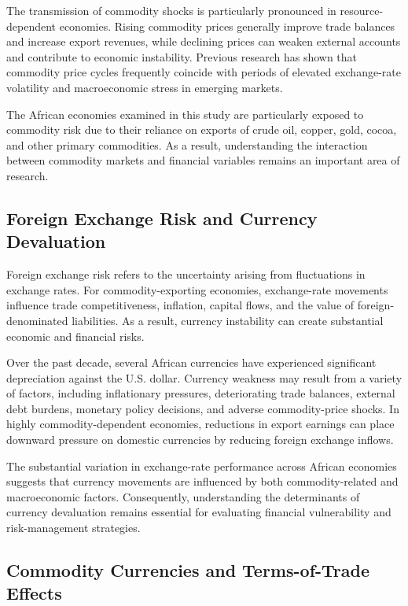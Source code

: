 \documentclass{article}
\begin{document}
The transmission of commodity shocks is particularly pronounced in resource-dependent economies. Rising commodity prices generally improve trade balances and increase export revenues, while declining prices can weaken external accounts and contribute to economic instability. Previous research has shown that commodity price cycles frequently coincide with periods of elevated exchange-rate volatility and macroeconomic stress in emerging markets.

The African economies examined in this study are particularly exposed to commodity risk due to their reliance on exports of crude oil, copper, gold, cocoa, and other primary commodities. As a result, understanding the interaction between commodity markets and financial variables remains an important area of research.

\subsection{Foreign Exchange Risk and Currency Devaluation}

Foreign exchange risk refers to the uncertainty arising from fluctuations in exchange rates. For commodity-exporting economies, exchange-rate movements influence trade competitiveness, inflation, capital flows, and the value of foreign-denominated liabilities. As a result, currency instability can create substantial economic and financial risks.

Over the past decade, several African currencies have experienced significant depreciation against the U.S. dollar. Currency weakness may result from a variety of factors, including inflationary pressures, deteriorating trade balances, external debt burdens, monetary policy decisions, and adverse commodity-price shocks. In highly commodity-dependent economies, reductions in export earnings can place downward pressure on domestic currencies by reducing foreign exchange inflows.

The substantial variation in exchange-rate performance across African economies suggests that currency movements are influenced by both commodity-related and macroeconomic factors. Consequently, understanding the determinants of currency devaluation remains essential for evaluating financial vulnerability and risk-management strategies.

\subsection{Commodity Currencies and Terms-of-Trade Effects}
\end{document}
